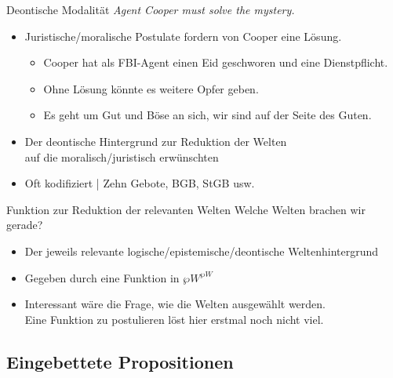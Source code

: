 \begin{frame}
  {Deontische Modalität}
  \onslide<+->
  \onslide<+->
  \textit{Agent Cooper \alert{must} solve the mystery.}\\
  \Halbzeile
  \begin{itemize}[<+->]
    \item \alert{Juristische\slash moralische Postulate} fordern von Cooper eine Lösung.\\
      \begin{itemize}[<+->]
        \item Cooper hat als FBI-Agent einen Eid geschworen und eine Dienstpflicht.
        \item Ohne Lösung könnte es weitere Opfer geben.
        \item Es geht um Gut und Böse an sich, wir sind auf der Seite des Guten.
      \end{itemize}
      \Halbzeile
    \item Der \alert{deontische Hintergrund} zur \alert{Reduktion der Welten\\
      auf die moralisch\slash juristisch erwünschten}
    \item Oft kodifiziert | Zehn Gebote, BGB, StGB usw.
  \end{itemize}
\end{frame}

\begin{frame}
  {Funktion zur Reduktion der relevanten Welten}
  \onslide<+->
  \onslide<+->
  Welche Welten brachen wir gerade?\\
  \Halbzeile
  \begin{itemize}[<+->]
    \item Der jeweils relevante logische\slash epistemische\slash deontische Weltenhintergrund
    \item Gegeben durch \alert{eine Funktion in $\wp W^{\wp W}$} 
      \Halbzeile
    \item Interessant wäre die Frage, wie die Welten ausgewählt werden.\\
      Eine Funktion zu postulieren löst hier erstmal noch nicht viel.
  \end{itemize}
\end{frame}


\subsection{Eingebettete Propositionen}

